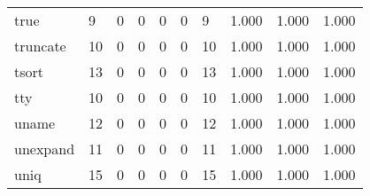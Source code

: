 \begin{longtable}{lp{1.3cm}p{1.3cm}p{1.3cm}p{1.3cm}p{1.3cm}p{1.3cm}p{1.3cm}p{1.3cm}p{1.3cm}}
true      &                      9 &                                             0 &                                            0 &                                           0 &                                            0 &                                          9 &                                1.000 &                                  1.000 &                                1.000 \\
truncate  &                     10 &                                             0 &                                            0 &                                           0 &                                            0 &                                         10 &                                1.000 &                                  1.000 &                                1.000 \\
tsort     &                     13 &                                             0 &                                            0 &                                           0 &                                            0 &                                         13 &                                1.000 &                                  1.000 &                                1.000 \\
tty       &                     10 &                                             0 &                                            0 &                                           0 &                                            0 &                                         10 &                                1.000 &                                  1.000 &                                1.000 \\
uname     &                     12 &                                             0 &                                            0 &                                           0 &                                            0 &                                         12 &                                1.000 &                                  1.000 &                                1.000 \\
unexpand  &                     11 &                                             0 &                                            0 &                                           0 &                                            0 &                                         11 &                                1.000 &                                  1.000 &                                1.000 \\
uniq      &                     15 &                                             0 &                                            0 &                                           0 &                                            0 &                                         15 &                                1.000 &                                  1.000 &                                1.000 \\

\end{longtable}
